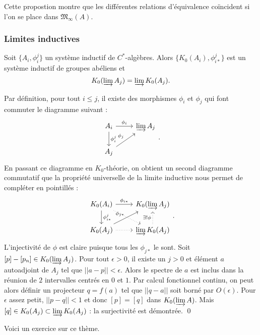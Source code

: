 Cette propostion montre que les différentes relations d'équivalence coïncident si l'on se place dans $\mathfrak M_\infty(A)$.

\subsubsection{Limites inductives}

\begin{prop}
Soit $\{A_i, \phi^j_i\}$ un système inductif de $C^*$-algèbres. Alors $\{K_0(A_i), \phi^j_{i*}\}$ est un système inductif de groupes abéliens et
\[K_0( \varinjlim A_j)= \varinjlim K_0(A_j).\]
\end{prop}
\begin{dem}
Par définition, pour tout $i\leq j$, il existe des morphismes $\phi_i$ et $\phi_j$ qui font commuter le diagramme suivant :
\[\begin{tikzcd}A_i \arrow{r}{\phi_i}\arrow{d}{\phi^j_i} & \varinjlim A_j \\
A_j \arrow{ur}{\phi_j}\end{tikzcd}.\]
En passant ce diagramme en $K_0$-théorie, on obtient un second diagramme commutatif que la propriété universelle de la limite inductive nous permet de compléter en pointillés :
\[\begin{tikzcd}K_0(A_i) \arrow{r}{\phi_{i*}}\arrow{d}{\phi^j_ {i*}}\arrow[dotted]{dr} & K_0(\varinjlim A_j) \\
K_0(A_j) \arrow[dotted]{r}\arrow{ur}{\phi_{j*}} & \varinjlim K_0(A_j)\arrow[dotted]{u}{\exists ! \phi}\end{tikzcd}.\]
L'injectivité de $\phi$ est claire puisque tous les $\phi_{j*}$ le sont. Soit $[p]-[p_n]\in K_0(\varinjlim A_j)$. Pour tout $\epsilon >0$, il existe un $j>0$ et élément $a$ autoadjoint de $A_j$ tel que $||a-p||<\epsilon$. Alors le spectre de $a$ est inclus dans la réunion de $2$ intervalles centrés en $0$ et $1$. Par calcul fonctionnel continu, on peut alors définir un projecteur $q=f(a)$ tel que $||q-a||$ soit borné par $O(\epsilon)$. Pour $\epsilon$ assez petit, $||p-q||<1$ et donc $[p]=[q]$ dans $K_0(\varinjlim A)$. Mais $[q]\in K_0(A_j)\subset \varinjlim K_0(A_j)$ : la surjectivité est démontrée.
\qed
\end{dem}

Voici un exercice sur ce thème.\\

